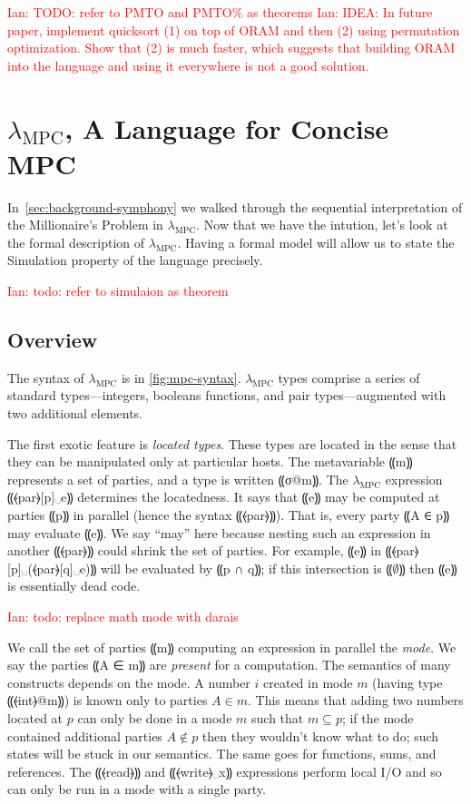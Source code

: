 \documentclass{report}
\newcommand{\mpc}{\ensuremath{\lambda_{\mathrm{MPC}}}\xspace}
\newcommand{\ins}[1]{\textcolor{red}{Ian: #1}}
\newcommand{\eset}{⸨∅⸩}
\begin{document}
\ins{TODO: refer to PMTO and PMTO\% as theorems}
\ins{IDEA: In future paper, implement quicksort (1) on top of ORAM and then (2) using permutation optimization. Show that (2) is much
  faster, which suggests that building ORAM into the language and using it everywhere is not a good solution.}

\chapter{\mpc, A Language for Concise MPC}
\label{ch:lam-mpc}

In~\cref{sec:background-symphony} we walked through the sequential interpretation of the Millionaire's Problem in \mpc. Now that we have
the intution, let's look at the formal description of \mpc. Having a formal model will allow us to state the Simulation property of the
language precisely.

\ins{todo: refer to simulaion as theorem}

\section{Overview}
\label{sec:lam-mpc-overview}

The syntax of \mpc is in \cref{fig:mpc-syntax}. \mpc types comprise a
series of standard types---integers, booleans functions, and pair types---augmented
with two additional elements.

The first exotic feature is \emph{located types}. These types are located
in the sense that they can be manipulated only at particular hosts.
The metavariable ⸨m⸩ represents a set of parties, and a type is written ⸨σ@m⸩. The \mpc expression
⸨⦑par⦒[p]␣e⸩ determines the locatedness. It says that ⸨e⸩ may be computed at
parties ⸨p⸩ in parallel (hence the syntax ⸨⦑par⦒⸩). That is, every
party ⸨A ∈ p⸩ may evaluate ⸨e⸩. We say ``may'' here because
nesting such an expression in another ⸨⦑par⦒⸩ could shrink the set of
parties. For example, ⸨e⸩ in ⸨⦑par⦒[p]␣(⦑par⦒[q]␣e)⸩ will be
evaluated by ⸨p ∩ q⸩; if this intersection is $\eset$ then ⸨e⸩
is essentially dead code.

\ins{todo: replace math mode with darais}

We call the set of parties ⸨m⸩ computing an expression in parallel
the \emph{mode}. We say the parties ⸨A ∈ m⸩ are \emph{present}
for a computation. The semantics of many constructs depends on the
mode. A number $i$ created in mode $m$ (having type ⸨⦑int⦒@m⸩) is
known only to parties $A \in m$. This means that adding two numbers
located at $p$ can only be done in a mode $m$ such that
$m \subseteq p$; if the mode contained additional parties
$A \not\in p$ then they wouldn't know what to do; such states will be
stuck in our semantics. The same goes for functions, sums, and
references. The ⸨⦑read⦒⸩ and ⸨⦑write⦒␣x⸩ expressions perform local
I/O and so can only be run in a mode with a single party.
\end{document}
